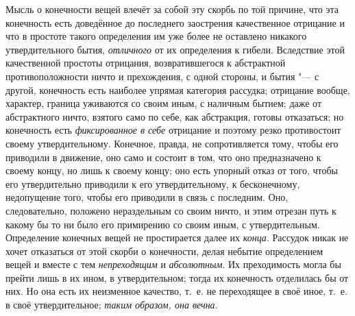 Мысль о конечности вещей влечёт за собой эту скорбь по той причине, что эта
конечность есть доведённое до последнего заострения качественное отрицание
и что в простоте такого определения им уже более не оставлено никакого
утвердительного бытия, {\em отличного} от их
определения к гибели. Вследствие этой качественной простоты отрицания,
возвратившегося к абстрактной противоположности ничто и прехождения, с
одной стороны, и бытия "--- с другой, конечность есть наиболее упрямая
категория рассудка; отрицание вообще, характер, граница уживаются со своим
иным, с наличным бытием; даже от абстрактного ничто, взятого само по
себе, как абстракция, готовы отказаться; но конечность есть
{\em фиксированное в себе} отрицание и поэтому резко
противостоит своему утвердительному. Конечное, правда, не сопротивляется
тому, чтобы его приводили в движение, оно само и состоит в том, что оно
предназначено к своему концу, но лишь к своему концу; оно есть упорный
отказ от того, чтобы его утвердительно приводили к его утвердительному, к
бесконечному, недопущение того, чтобы его приводили в связь с последним.
Оно, следовательно, положено нераздельным со своим ничто, и этим отрезан
путь к какому бы то ни было его примирению со своим иным, с
утвердительным. Определение конечных вещей не простирается далее их
{\em конца}. Рассудок никак не хочет отказаться от этой
скорби о конечности, делая небытие определением вещей и вместе с тем
{\em непреходящим} и
{\em абсолютным}. Их преходимость могла бы прейти лишь
в их ином, в утвердительном; тогда их конечность отделилась бы от них. Но
она есть их неизменное качество, т.~е. не переходящее в своё иное, т.~е.
в своё утвердительное; {\em таким образом, она вечна}.

